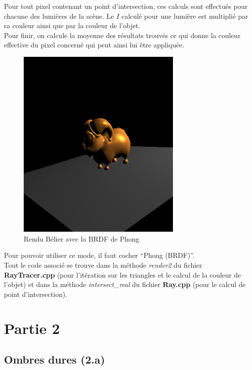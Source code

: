 \documentclass[a4paper,11pt,titlepage]{article}
\begin{document}
Pour tout pixel contenant un point d'intersection, ces calculs sont effectués pour chacune des lumières de la scène. Le $I$ calculé pour une lumière est multiplié par sa couleur ainsi que par la couleur de l'objet.\\
Pour finir, on calcule la moyenne des résultats trouvés ce qui donne la couleur effective du pixel concerné qui peut ainsi lui être appliquée.\\

\begin{figure}[H]
 \begin{center}
 \includegraphics[width=8cm]{Rendu/BRDF.png}
 \end{center}

 \caption{Rendu Bélier avec la BRDF de Phong}
 \label{rendu2}
\end{figure}

Pour pouvoir utiliser ce mode, il faut cocher ``Phong (BRDF)''.\\

Tout le code associé se trouve dans la méthode \textit{render2} du fichier \textbf{RayTracer.cpp} (pour l'itération sur les triangles et le calcul de la couleur de l'objet) et dans la méthode \textit{intersect\_real} du fichier \textbf{Ray.cpp} (pour le calcul de point d'intersection).

\newpage
\section{Partie 2}

\subsection{Ombres dures (2.a)}
\end{document}
